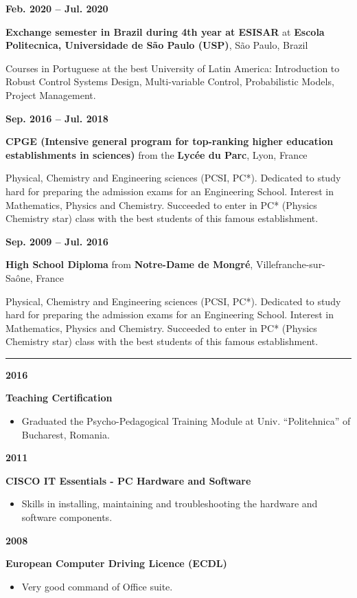 \documentclass[a4paper,10pt]{article}
\newlength{\cvcolumngapwidth}
\newlength{\cvleftcolumnwidth}
\newlength{\cvrightcolumnwidth}
\newcommand{\cvsectionstyle}[1]{{\large\cvsectionfont\textcolor{cvsectioncolor}{#1}}}
\newcommand{\cvtitlestyle}[1]{{\large\cvtitlefont\textcolor{cvtitlecolor}{#1}}}
\newcommand{\cvdurationstyle}[1]{{\cvdurationfont\textcolor{cvdurationcolor}{#1}}}
\newlength{\cvafteritemskipamount}
\newlength{\cvaftersectionskipamount}
\newlength{\cvaftertitleskipamount}
\newlength{\cvparskip}
\newcommand{\cvsection}[1]{
    \begin{minipage}[t]{\cvleftcolumnwidth}
        \raggedleft\cvsectionstyle{#1}
    \end{minipage}%
    \hspace{\cvcolumngapwidth}%
    \begin{minipage}[t]{\cvrightcolumnwidth}
        \textcolor{cvrulecolor}{\rule{\cvrightcolumnwidth}{0.3mm}}
    \end{minipage}

    \vspace{\cvaftersectionskipamount}
}
\newcommand{\cvitem}[2]{
    \begin{minipage}[t]{\cvleftcolumnwidth}
        \raggedleft #1
    \end{minipage}%
    \hspace{\cvcolumngapwidth}%
    \begin{minipage}[t]{\cvrightcolumnwidth}
        \setlength{\parskip}{\cvparskip} #2
    \end{minipage}

    \vspace{\cvafteritemskipamount}
}
\newcommand{\cvtitle}[1]{
    \cvtitlestyle{#1}

    \vspace{\cvaftertitleskipamount}
    \vspace{-\cvparskip}
}
\begin{document}
\cvitem{
    \cvdurationstyle{\textbf{Feb. 2020 -- Jul. 2020}}
}{
    \cvtitle{\textbf{Exchange semester in  Brazil during 4th year at ESISAR} at \textbf{Escola Politecnica, Universidade de São Paulo (USP)}, São Paulo, Brazil}


    Courses in Portuguese at the best University of Latin America: Introduction to Robust Control Systems Design, Multi-variable Control, Probabilistic Models, Project Management.

}

\cvitem{
    \cvdurationstyle{\textbf{Sep. 2016 -- Jul. 2018}}
}{
    \cvtitle{\textbf{CPGE (Intensive general program for top-ranking higher education establishments in sciences)} from the \textbf{Lycée du Parc}, Lyon, France}

    Physical, Chemistry and Engineering sciences (PCSI, PC*). Dedicated to study hard for preparing the admission exams for an Engineering School. Interest in Mathematics, Physics and Chemistry. Succeeded to enter in PC* (Physics Chemistry star) class with the best students of this famous establishment.
}

\cvitem{
    \cvdurationstyle{\textbf{Sep. 2009 -- Jul. 2016}}
}{
    \cvtitle{\textbf{High School Diploma} from \textbf{Notre-Dame de Mongré}, Villefranche-sur-Saône, France}

    Physical, Chemistry and Engineering sciences (PCSI, PC*). Dedicated to study hard for preparing the admission exams for an Engineering School. Interest in Mathematics, Physics and Chemistry. Succeeded to enter in PC* (Physics Chemistry star) class with the best students of this famous establishment.
}

\vspace{0.2cm}


\cvsection{Certifications}
\cvitem{
    \cvdurationstyle{\textbf{2016}}
}{  %
    \textbf{Teaching Certification}
    \begin{itemize}[leftmargin=*]
        \item Graduated the Psycho-Pedagogical Training Module at Univ. ``Politehnica'' of Bucharest, Romania.
    \end{itemize}
}
\vspace{-0.3cm}
\cvitem{
    \cvdurationstyle{\textbf{2011}}
}{
    \textbf{CISCO IT Essentials - PC Hardware and Software}
    \begin{itemize}[leftmargin=*]
        \item Skills in installing, maintaining and troubleshooting the hardware and software components.
    \end{itemize}
}
\vspace{-0.3cm}
\cvitem{
    \cvdurationstyle{\textbf{2008}}
}{
    \textbf{European Computer Driving Licence (ECDL)}
    \begin{itemize}[leftmargin=*]
        \item Very good command of Office suite.
    \end{itemize}
}
\end{document}
